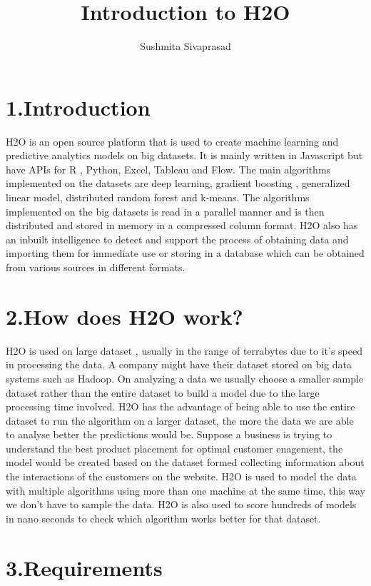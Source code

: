 \documentclass[9pt,twocolumn,twoside]{../../styles/osajnl}
\title{Introduction to H2O}
\author[1]{Sushmita Sivaprasad}
\affil[1]{School of Informatics and Computing, Bloomington, IN 47408, U.S.A.}
\affil[*]{ sushsiva@umail.iu.edu}
\begin{document}
\maketitle

\section{1.Introduction}

H2O is an open source platform that is used to create machine learning
and predictive analytics models on big datasets. It is mainly written
in Javascript but have APIs for R , Python, Excel, Tableau and
Flow\cite{www-h2o-webpage}. The main algorithms implemented on the
datasets are deep learning, gradient boosting , generalized linear
model, distributed random forest and k-means. The algorithms
implemented on the big datasets is read in a parallel manner and is
then distributed and stored in memory in a compressed column
format. H2O also has an inbuilt intelligence to detect and support the
process of obtaining data and importing them for immediate use or
storing in a database which can be obtained from various sources in
different formats\cite{www-h2o-webpage}.

\section{2.How does H2O work?}

H2O is used on large dataset , usually in the range of terrabytes due
to it's speed in processing the data. A company might have their
dataset stored on big data systems such as Hadoop. On analyzing a data
we usually choose a smaller sample dataset rather than the entire
dataset to build a model due to the large processing time
involved. H2O has the advantage of being able to use the entire
dataset to run the algorithm on a larger dataset, the more the data we
are able to analyse better the predictions would
be\cite{www-h2oyoutubevideo}. Suppose a business is trying to
understand the best product placement for optimal customer enagement,
the model would be created based on the dataset formed collecting
information about the interactions of the customers on the
website. H2O is used to model the data with multiple algorithms using
more than one machine at the same time, this way we don’t have to
sample the data\cite{www-h2oyoutubevideo}. H2O is also used to score
hundreds of models in nano seconds to check which algorithm works
better for that dataset.

\section{3.Requirements}
\end{document}
